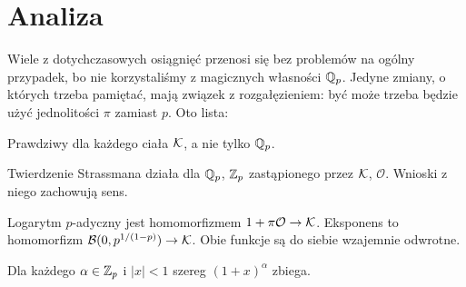 \section{Analiza}
Wiele  z dotychczasowych osiągnięć przenosi się bez problemów na ogólny przypadek, bo nie korzystaliśmy z magicznych własności $\mathbb Q_p$.
Jedyne zmiany, o których trzeba pamiętać, mają związek z rozgałęzieniem: być może trzeba będzie użyć jednolitości $\pi$ zamiast $p$. Oto lista:

\begin{fakt}
	[\ref{reginald}, \ref{ingentis}, \ref{caedis}, \ref{decoris}, \ref{auctoris}, \ref{causeahriot}, \ref{stummeschreie}] Prawdziwy dla każdego ciała $\mathcal K$, a nie tylko $\mathbb Q_p$.
\end{fakt}

\begin{fakt}
	Twierdzenie Strassmana działa dla $\mathbb Q_p$, $\mathbb Z_p$ zastąpionego przez $\mathcal K$, $\mathcal O$.
	Wnioski z niego zachowują sens.
\end{fakt}

\begin{fakt}
	Logarytm $p$-adyczny jest homomorfizmem $1 + \pi \mathcal O \to \mathcal K$.
	Eksponens to homomorfizm $\mathcal B(0, p^{1/(1-p)}) \to \mathcal K$.
	Obie funkcje są do siebie wzajemnie odwrotne.
\end{fakt}

\begin{fakt}
	Dla każdego $\alpha \in \mathbb Z_p$ i $|x| < 1$ szereg $(1+x)^\alpha$ zbiega.
\end{fakt}